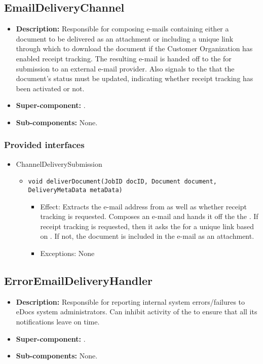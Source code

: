 \subsection{EmailDeliveryChannel}
\begin{itemize}
    \item \textbf{Description:} Responsible for composing e-mails containing either a document to be delivered as an attachment or including a unique link through which to download the document if the Customer Organization has enabled receipt tracking. The resulting e-mail is handed off to the  for submission to an external e-mail provider. Also signals to the  that the document's status must be updated, indicating whether receipt tracking has been activated or not.
    \item \textbf{Super-component:} .
    \item \textbf{Sub-components:} None.
\end{itemize}

\subsubsection*{Provided interfaces}
\begin{itemize}
    \item ChannelDeliverySubmission
    \begin{itemize}
        \item \texttt{void deliverDocument(JobID docID, Document document, DeliveryMetaData metaData)}
        \begin{itemize}
            \item Effect: Extracts the e-mail address from  as well as whether receipt tracking is requested. Composes an e-mail and hands it off the the . If receipt tracking is requested, then it asks the  for a unique link based on . If not, the document is included in the e-mail as an attachment.
            \item Exceptions: None
        \end{itemize}
    \end{itemize}
\end{itemize}

\subsection{ErrorEmailDeliveryHandler}
\begin{itemize}
    \item \textbf{Description:} Responsible for reporting internal system errors/failures to eDocs system administrators. Can inhibit activity of the  to ensure that all its notifications leave on time.
    \item \textbf{Super-component:} .
    \item \textbf{Sub-components:} None.
\end{itemize}

